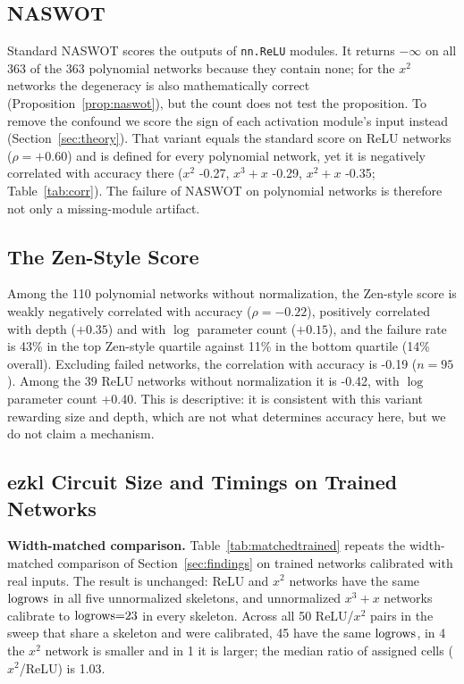 




\subsection{NASWOT}

Standard NASWOT scores the outputs of \texttt{nn.ReLU} modules.  It returns $-\infty$ on all 363 of the 363 polynomial networks because they contain none; for the $x^2$ networks the degeneracy
is also mathematically correct (Proposition~\ref{prop:naswot}), but the count does not test the proposition.  To remove the confound we score the sign of each activation module's input instead
(Section~\ref{sec:theory}).  That variant equals the standard score on ReLU networks ($\rho=+0.60$) and is defined for every polynomial network, yet it is negatively correlated with accuracy there
($x^2$ -0.27, $x^3{+}x$ -0.29, $x^2{+}x$ -0.35; Table~\ref{tab:corr}).  The failure of NASWOT on polynomial networks is
therefore not only a missing-module artifact.



\subsection{The Zen-Style Score}

Among the 110 polynomial networks without normalization, the Zen-style score is weakly negatively correlated with accuracy ($\rho=-0.22$), positively correlated with depth ($+0.35$)
and with $\log$ parameter count ($+0.15$), and the failure rate is 43\% in the top Zen-style quartile against 11\% in the bottom quartile
(14\% overall).  Excluding failed networks, the correlation with accuracy is -0.19 ($n=95$).  Among the 39 ReLU networks without normalization it is -0.42, with $\log$ parameter count +0.40.
This is descriptive: it is consistent with this variant rewarding size and depth, which are not what determines accuracy here, but we do not claim a mechanism.

\subsection{ezkl Circuit Size and Timings on Trained Networks}
\label{sec:ezkltrained}

\textbf{Width-matched comparison.}  Table~\ref{tab:matchedtrained} repeats the width-matched comparison of Section~\ref{sec:findings} on trained networks calibrated with real inputs.
The result is unchanged: ReLU and $x^2$ networks have the same $\mathrm{logrows}$ in all five unnormalized skeletons, and unnormalized $x^3{+}x$ networks calibrate to $\mathrm{logrows}{=}23$ in every skeleton.
Across all 50 ReLU/$x^2$ pairs in the sweep that share a skeleton and were calibrated, 45 have the same $\mathrm{logrows}$, in 4 the $x^2$ network is smaller and in 1 it is larger; the median
ratio of assigned cells ($x^2$/ReLU) is 1.03.

